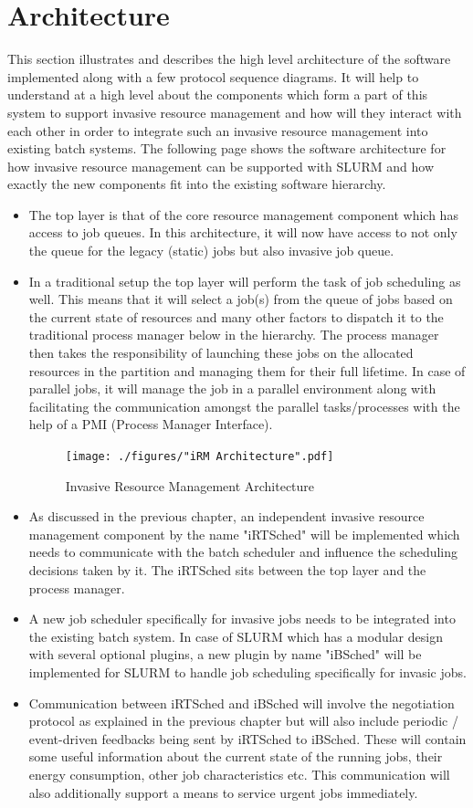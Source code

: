 \chapter{Architecture}
\label{chapter:dynamic resource}
This section illustrates and describes the high level architecture of the software implemented along with a few protocol sequence diagrams. It will help to understand at a high level about the components which form a part of this system to support invasive resource management and how will they interact with each other in order to integrate such an invasive resource management into existing batch systems. The following page shows the software architecture for how invasive resource management can be supported with SLURM and how exactly the new components fit into the existing software hierarchy.
\begin{itemize}
\item The top layer is that of the core resource management component which has access to job queues. In this architecture, it will now have access to not only the queue for the legacy (static) jobs but also invasive job queue.
\item In a traditional setup the top layer will perform the task of job scheduling as well. This means that it will select a job(s) from the queue of jobs based on the current state of resources and many other factors to dispatch it to the traditional process manager below in the hierarchy. The process manager then takes the responsibility of launching these jobs on the allocated resources in the partition and managing them for their full lifetime. In case of parallel jobs, it will manage the job in a parallel environment along with facilitating the communication amongst the parallel tasks/processes with the help of a PMI (Process Manager Interface). 
\begin{figure}[!htbp]
\centering
\texttt{[image: ./figures/"iRM Architecture".pdf]}
\caption{Invasive Resource Management Architecture}
\label{fig:7}
\end{figure}
\item As discussed in the previous chapter, an independent invasive resource management component by the name "iRTSched" will be implemented which needs to communicate with the batch scheduler and influence the scheduling decisions taken by it. The iRTSched sits between the top layer and the process manager.
\item A new job scheduler specifically for invasive jobs needs to be integrated into the existing batch system. In case of SLURM which has a modular design with several optional plugins, a new plugin by name "iBSched" will be implemented for SLURM to handle job scheduling specifically for invasic jobs.
\item Communication between iRTSched and iBSched will involve the negotiation protocol as explained in the previous chapter but will also include periodic / event-driven feedbacks being sent by iRTSched to iBSched. These will contain some useful information about the current state of the running jobs, their energy consumption, other job characteristics etc. This communication will also additionally support a means to service urgent jobs immediately.
\end{itemize}

